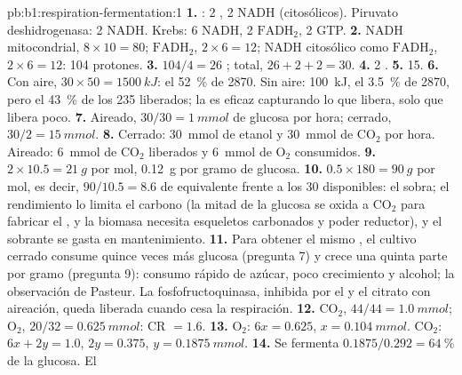 \begin{solution}{pb:b1:respiration-fermentation:1}
\textbf{1.} : 2 , 2 NADH (citosólicos). Piruvato
deshidrogenasa: 2 NADH. Krebs: 6 NADH, 2 $\mathrm{FADH_2}$, 2 GTP.
\textbf{2.} NADH mitocondrial, $8\times 10 = 80$; $\mathrm{FADH_2}$,
$2\times 6 = 12$; NADH citosólico como $\mathrm{FADH_2}$, $2\times 6 = 12$:
104 protones.
\textbf{3.} $104/4 = 26$ ; total, $26 + 2 + 2 = 30$.
\textbf{4.} 2 .
\textbf{5.} 15.
\textbf{6.} Con aire, $30\times 50 = \qty{1500}{kJ}$: el \qty{52}{\%} de
2870. Sin aire: \qty{100}{kJ}, el \qty{3.5}{\%} de 2870, pero el
\qty{43}{\%} de los 235 liberados; la  es eficaz capturando lo
que libera, solo que libera poco.
\textbf{7.} Aireado, $30/30 = \qty{1}{mmol}$ de glucosa por hora; cerrado,
$30/2 = \qty{15}{mmol}$.
\textbf{8.} Cerrado: \qty{30}{mmol} de etanol y \qty{30}{mmol} de
$\mathrm{CO_2}$ por hora. Aireado: \qty{6}{mmol} de $\mathrm{CO_2}$
liberados y \qty{6}{mmol} de $\mathrm{O_2}$ consumidos.
\textbf{9.} $2\times 10.5 = \qty{21}{g}$ por mol, \qty{0.12}{g} por gramo de
glucosa.
\textbf{10.} $0.5\times 180 = \qty{90}{g}$ por mol, es decir, $90/10.5 =
8.6$  de equivalente frente a los 30 disponibles: el  sobra; el
rendimiento lo limita el carbono (la mitad de la glucosa se oxida a
$\mathrm{CO_2}$ para fabricar el , y la biomasa necesita esqueletos
carbonados y poder reductor), y el  sobrante se gasta en mantenimiento.
\textbf{11.} Para obtener el mismo , el cultivo cerrado consume quince
veces más glucosa (pregunta 7) y crece una quinta parte por gramo (pregunta
9): consumo rápido de azúcar, poco crecimiento y alcohol; la observación de
Pasteur. La fosfofructoquinasa, inhibida por el  y el citrato con
aireación, queda liberada cuando cesa la respiración.
\textbf{12.} $\mathrm{CO_2}$, $44/44 = \qty{1.0}{mmol}$; $\mathrm{O_2}$,
$20/32 = \qty{0.625}{mmol}$: CR $= 1.6$.
\textbf{13.} $\mathrm{O_2}$: $6x = 0.625$, $x = \qty{0.104}{mmol}$.
$\mathrm{CO_2}$: $6x + 2y = 1.0$, $2y = 0.375$, $y = \qty{0.1875}{mmol}$.
\textbf{14.} Se fermenta $0.1875/0.292 = \qty{64}{\%}$ de la glucosa. El 

\end{solution}

